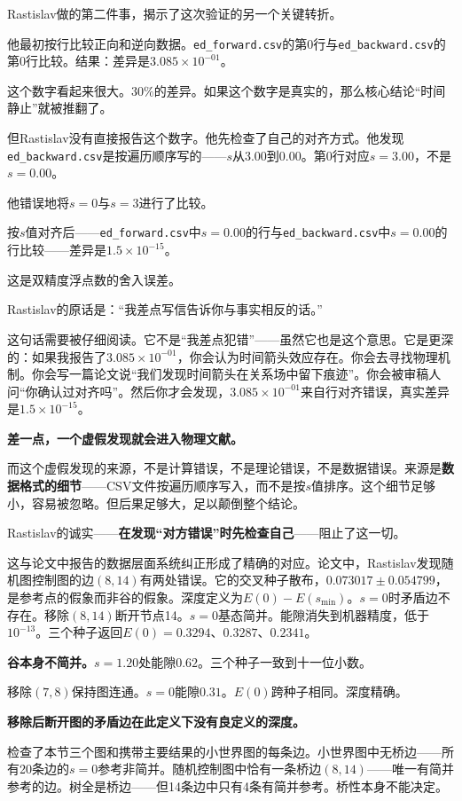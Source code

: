 \documentclass[11pt,a4paper]{book}
\theoremstyle{definition}
\begin{document}
Rastislav做的第二件事，揭示了这次验证的另一个关键转折。

他最初按行比较正向和逆向数据。\texttt{ed\_forward.csv}的第0行与\texttt{ed\_backward.csv}的第0行比较。结果：差异是$3.085\times10^{-01}$。

这个数字看起来很大。$30\%$的差异。如果这个数字是真实的，那么核心结论“时间静止”就被推翻了。

但Rastislav没有直接报告这个数字。他先检查了自己的对齐方式。他发现\texttt{ed\_backward.csv}是按遍历顺序写的——$s$从3.00到0.00。第0行对应$s=3.00$，不是$s=0.00$。

他错误地将$s=0$与$s=3$进行了比较。

按$s$值对齐后——\texttt{ed\_forward.csv}中$s=0.00$的行与\texttt{ed\_backward.csv}中$s=0.00$的行比较——差异是\textbf{$1.5\times10^{-15}$}。

这是双精度浮点数的舍入误差。

Rastislav的原话是：“我差点写信告诉你与事实相反的话。”

这句话需要被仔细阅读。它不是“我差点犯错”——虽然它也是这个意思。它是更深的：如果我报告了$3.085\times10^{-01}$，你会认为时间箭头效应存在。你会去寻找物理机制。你会写一篇论文说“我们发现时间箭头在关系场中留下痕迹”。你会被审稿人问“你确认过对齐吗”。然后你才会发现，$3.085\times10^{-01}$来自行对齐错误，真实差异是$1.5\times10^{-15}$。

\textbf{差一点，一个虚假发现就会进入物理文献。}

而这个虚假发现的来源，不是计算错误，不是理论错误，不是数据错误。来源是\textbf{数据格式的细节}——CSV文件按遍历顺序写入，而不是按$s$值排序。这个细节足够小，容易被忽略。但后果足够大，足以颠倒整个结论。

Rastislav的诚实——\textbf{在发现“对方错误”时先检查自己}——阻止了这一切。

这与论文中报告的数据层面系统纠正形成了精确的对应。论文中，Rastislav发现随机图控制图的边$(8,14)$有两处错误。它的交叉种子散布，$0.073017\pm0.054799$，是参考点的假象而非谷的假象。深度定义为$E(0)-E(s_{\min})$。$s=0$时矛盾边不存在。移除$(8,14)$断开节点14。$s=0$基态简并。能隙消失到机器精度，低于$10^{-13}$。三个种子返回$E(0)=0.3294$、$0.3287$、$0.2341$。

\textbf{谷本身不简并。}$s=1.20$处能隙$0.62$。三个种子一致到十一位小数。

移除$(7,8)$保持图连通。$s=0$能隙$0.31$。$E(0)$跨种子相同。深度精确。

\textbf{移除后断开图的矛盾边在此定义下没有良定义的深度。}

检查了本节三个图和携带主要结果的小世界图的每条边。小世界图中无桥边——所有20条边的$s=0$参考非简并。随机控制图中恰有一条桥边$(8,14)$——唯一有简并参考的边。树全是桥边——但14条边中只有4条有简并参考。桥性本身不能决定。
\end{document}
